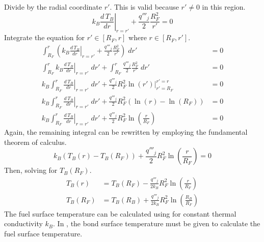       Divide  by the radial coordinate $r'$. This is
      valid because $r' \ne 0$ in this region.
      \begin{equation}
        \left. k_B \frac{d\,T_B}{dr} \right|_{r=r'} + 
          \frac{q'''_j}{2} \frac{R_F^2}{r'} = 0
      \end{equation}
      Integrate the equation for $r' \in [R_F,r]$ where $r \in [R_F,r']$.
      \begin{align}
        \int_{R_F}^r \left( \left. k_B \frac{d\,T_B}{dr}\right|_{r=r'}
          + \frac{q'''_j}{2} \frac{R_F^2}{r'} \right) \; dr' &= 0 \\
        \int_{R_F}^r \left. k_B \frac{d\,T_B}{dr}\right|_{r=r'} \; dr'
          + \int_{R_F}^r \frac{q'''_j}{2} \frac{R_F^2}{r'} \; dr' &= 0\\
        k_B \int_{R_F}^r \left. \frac{d\,T_B}{dr}\right|_{r=r'} \; dr'
          + \frac{q'''_j}{2} R_F^2 \left. \ln(r') \right|_{r'=R_F}^{r'=r} &= 0\\
        k_B \int_{R_F}^r \left. \frac{d\,T_B}{dr}\right|_{r=r'} \; dr'
          + \frac{q'''_j}{2} R_F^2 ( \ln(r) - \ln(R_F)) &= 0 \\
        k_B \int_{R_F}^r \left. \frac{d\,T_B}{dr}\right|_{r=r'} \; dr'
          + \frac{q'''_j}{2} R_F^2 \ln\left(\frac{r}{R_F}\right) &= 0 
      \end{align}
      Again, the remaining integral can be rewritten by employing the
      fundamental theorem of calculus.
      \begin{equation}
        \label{eq:tf_fundamental_theorem}
        k_B (T_B(r) - T_B(R_F)) + \frac{q'''_j}{2} R_F^2 
          \ln\left(\frac{r}{R_F}\right) = 0
      \end{equation}
      Then, solving for $T_B(R_F)$.
      \begin{align}
        \label{eq:tbr}
        T_B(r) &= T_B(R_F) - \frac{q'''_j}{2 k_B} R_F^2 
          \ln\left(\frac{r}{R_F}\right) \\
        \label{eq:tf_forward}
        T_B(R_F) &= T_B(R_B) + \frac{q'''_j}{2 k_B} R_F^2 
          \ln\left(\frac{R_B}{R_F}\right)
      \end{align}
      The fuel surface temperature can be calculated using
       for constant thermal conductivity $k_B$.
      In , the bond surface temperature must be
      given to calculate the fuel surface temperature.

